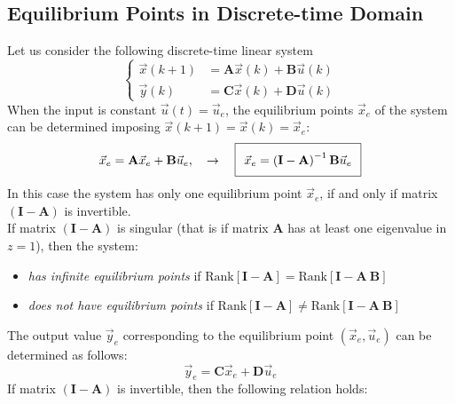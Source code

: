 \documentclass[12pt,a4paper,oneside]{book}
\begin{document}
\begin{onehalfspace}
\subsection{Equilibrium Points in Discrete-time Domain} 
Let us consider the following discrete-time linear system
\begin{equation}\label{eq73}
	\left\lbrace 
	\begin{aligned}
		\vec{x}(k+1) &= \mathbf{A}\vec{x}(k)+\mathbf{B}\vec{u}(k) \\[6pt]
		\vec{y}(k) &= \mathbf{C}\vec{x}(k)+\mathbf{D}\vec{u}(k)
	\end{aligned}
	\right. 
\end{equation}
When the input is constant $\vec{u}(t) = \vec{u}_e$, the equilibrium points 
$\vec{x}_e$ of the system can be determined imposing $\vec{x}(k+1)=\vec{x}(k) = 
\vec{x}_e$:
\begin{equation}\label{eq74} 
	\setlength\fboxsep{0.25cm}
	\setlength\fboxrule{0.4pt}
	\begin{aligned}
		\vec{x}_e = \mathbf{A}\vec{x}_e + {\mathbf{B}}\vec{u}_e, \quad 
		\rightarrow \quad
		\boxed{ \vec{x}_e=\left( \mathbf{I}-{\mathbf{A}}\right) ^{-1} 
		{\mathbf{B}}\vec{u}_e }
	\end{aligned}
\end{equation}
In this case the system has only one equilibrium point $\vec{x}_e$, if and only 
if matrix $\left(\mathbf{I}-\mathbf{A}\right)$ is invertible. \\
If matrix $\left(\mathbf{I}-\mathbf{A}\right)$ is singular (that is if matrix 
$\mathbf{A}$ has at least one eigenvalue in $z = 1$), then the system:
\begin{itemize}
	\item \textit{has infinite equilibrium points} if 
	$\text{Rank}\left[\mathbf{I}-\mathbf{A} \right] 
	=\text{Rank}\left[\mathbf{I}-\mathbf{A} \ \mathbf{B}\right]$
	\item \textit{does not have equilibrium points} if 
	$\text{Rank}\left[\mathbf{I}-\mathbf{A} \right] \ne 
	\text{Rank}\left[\mathbf{I}-\mathbf{A} \ \mathbf{B}\right]$
\end{itemize}
The output value $\vec{y}_e$ corresponding to the equilibrium point $\left( 
\vec{x}_e, \vec{u}_e \right)$ can be determined as follows:
\begin{equation}\label{eq75} 
	\vec{y}_e = \mathbf{C}\vec{x}_e+\mathbf{D}\vec{u}_e
\end{equation}
If matrix $\left(\mathbf{I}-\mathbf{A}\right)$ is invertible, then the 
following relation holds:

\end{onehalfspace}
\end{document}
